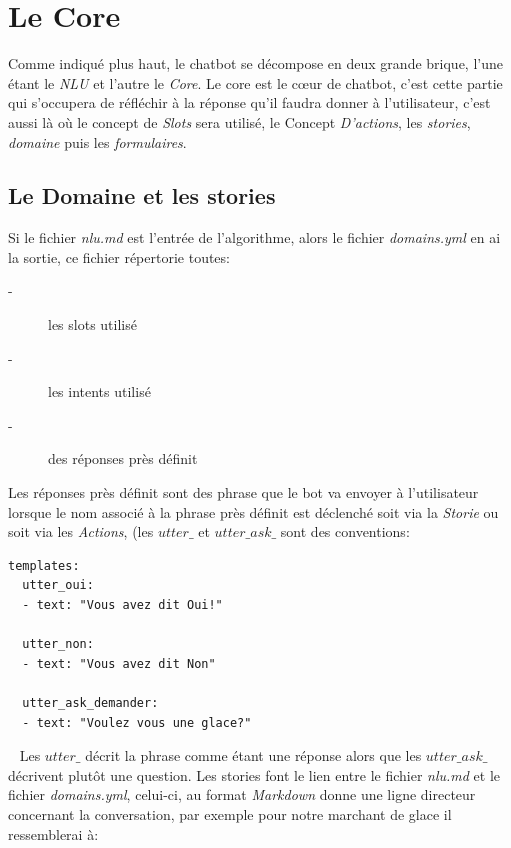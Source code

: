 \chapter{Le Core}

Comme indiqué plus haut, le chatbot se décompose en deux grande brique, l'une étant le \textit{NLU} et l'autre le \textit{Core}. Le core est le cœur de chatbot, c'est cette partie qui s'occupera de réfléchir à la réponse qu'il faudra donner à l'utilisateur, c'est aussi là où le concept de \textit{Slots} sera utilisé, le Concept \textit{D'actions}, les \textit{stories}, \textit{domaine} puis les \textit{formulaires}.\\
\pagebreak

\section{Le Domaine et les stories}
Si le fichier \textit{nlu.md} est l'entrée de l'algorithme, alors le fichier \textit{domains.yml} en ai la sortie, ce fichier répertorie toutes:

\begin{description}
\item[-] les slots utilisé
\item[-] les intents utilisé
\item[-] des réponses près définit 
\end{description}

Les réponses près définit sont des phrase que le bot va envoyer à l'utilisateur lorsque le nom associé à la phrase près définit est déclenché soit via la \textit{Storie} ou soit via les \textit{Actions}, (les \textit{$utter\_$} et \textit{$utter\_ask\_$} sont des conventions:

\begin{lstlisting}
templates:
  utter_oui:
  - text: "Vous avez dit Oui!"

  utter_non:
  - text: "Vous avez dit Non"
  
  utter_ask_demander:
  - text: "Voulez vous une glace?"
\end{lstlisting}
\ \linebreak
Les \textit{$utter\_$} décrit la phrase comme étant une réponse alors que les \textit{$utter\_ask\_$} décrivent plutôt une question.
Les stories font le lien entre le fichier \textit{nlu.md} et le fichier \textit{domains.yml}, celui-ci, au format \textit{Markdown} donne une ligne directeur concernant la conversation, par exemple pour notre marchant de glace il ressemblerai à:

